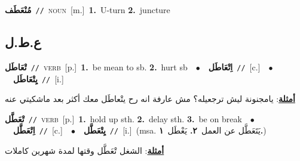 \documentclass[10pt,a4paper,twoside]{article} %
\begin{document}
\begin{multicols}{2}
{\setlength\topsep{0pt}\textbf{\foreignlanguage{arabic}{مُنْعَطَف}}\ {\color{gray}\texttt{//}\color{black}}\ \textsc{noun}\ [m.]\ \textbf{1.}~U-turn  \textbf{2.}~juncture\ } \vspace{2mm}

\vspace{-3mm}
\subsection*{\color{blue}\foreignlanguage{arabic}{ع.ط.ل}\color{blue}{}} 

{\setlength\topsep{0pt}\textbf{\foreignlanguage{arabic}{تْعَاطَل}}\ {\color{gray}\texttt{//}\color{black}}\ \textsc{verb}\ [p.]\ \textbf{1.}~be mean to sb.  \textbf{2.}~hurt sb\ \ $\bullet$\ \ \setlength\topsep{0pt}\textbf{\foreignlanguage{arabic}{اِتْعَاطَل}}\ {\color{gray}\texttt{//}\color{black}}\ [c.]\ \ $\bullet$\ \ \setlength\topsep{0pt}\textbf{\foreignlanguage{arabic}{يِتْعَاطَل}}\ {\color{gray}\texttt{//}\color{black}}\ [i.]\  \begin{flushright}\color{gray}\foreignlanguage{arabic}{\textbf{\underline{\foreignlanguage{arabic}{أمثلة}}}: يامجنونة ليش ترجعيله؟ مش عارفة انه رح يتْعاطَل معك أكثر بعد ماشكيتي عنه}\end{flushright}\color{black}} \vspace{2mm}

{\setlength\topsep{0pt}\textbf{\foreignlanguage{arabic}{تْعَطَّل}}\ {\color{gray}\texttt{//}\color{black}}\ \textsc{verb}\ [p.]\ \textbf{1.}~hold up sth.  \textbf{2.}~delay sth.  \textbf{3.}~be on break\ \ $\bullet$\ \ \setlength\topsep{0pt}\textbf{\foreignlanguage{arabic}{اِتْعَطَّل}}\ {\color{gray}\texttt{//}\color{black}}\ [c.]\ \ $\bullet$\ \ \setlength\topsep{0pt}\textbf{\foreignlanguage{arabic}{يِتْعَطَّل}}\ {\color{gray}\texttt{//}\color{black}}\ [i.]\ \color{gray}(msa. \foreignlanguage{arabic}{يَتَعَطَّل عن العمل}~\foreignlanguage{arabic}{\textbf{٢.}}  \foreignlanguage{arabic}{يَعْطَل}~\foreignlanguage{arabic}{\textbf{١.}})\color{black}\  \begin{flushright}\color{gray}\foreignlanguage{arabic}{\textbf{\underline{\foreignlanguage{arabic}{أمثلة}}}: الشغل تْعَطَّل وقتها لمدة شهرين كاملات}\end{flushright}\color{black}} \vspace{2mm}


\end{multicols}
\end{document}
